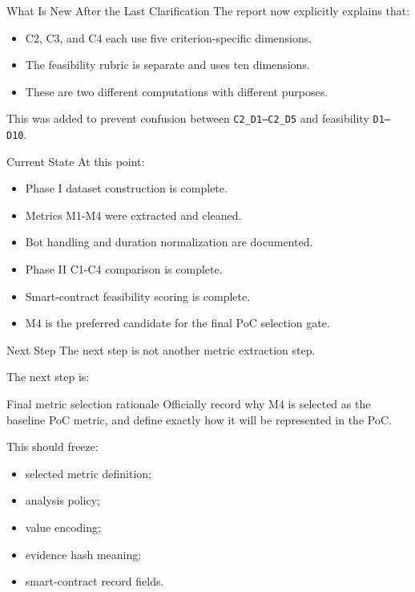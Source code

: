 \documentclass[aspectratio=169,11pt]{beamer}
\begin{document}
\begin{frame}{What Is New After the Last Clarification}
  The report now explicitly explains that:

  \begin{itemize}
    \item C2, C3, and C4 each use five criterion-specific dimensions.
    \item The feasibility rubric is separate and uses ten dimensions.
    \item These are two different computations with different purposes.
  \end{itemize}

  \vspace{0.3cm}
  This was added to prevent confusion between \texttt{C2\_D1--C2\_D5} and feasibility \texttt{D1--D10}.
\end{frame}

\begin{frame}{Current State}
  At this point:
  \begin{itemize}
    \item Phase I dataset construction is complete.
    \item Metrics M1-M4 were extracted and cleaned.
    \item Bot handling and duration normalization are documented.
    \item Phase II C1-C4 comparison is complete.
    \item Smart-contract feasibility scoring is complete.
    \item M4 is the preferred candidate for the final PoC selection gate.
  \end{itemize}
\end{frame}

\begin{frame}{Next Step}
  The next step is not another metric extraction step.

  \vspace{0.3cm}
  The next step is:
  \begin{block}{Final metric selection rationale}
    Officially record why M4 is selected as the baseline PoC metric, and define exactly how it will be represented in the PoC.
  \end{block}

  \vspace{0.3cm}
  This should freeze:
  \begin{itemize}
    \item selected metric definition;
    \item analysis policy;
    \item value encoding;
    \item evidence hash meaning;
    \item smart-contract record fields.
  \end{itemize}
\end{frame}
\end{document}
